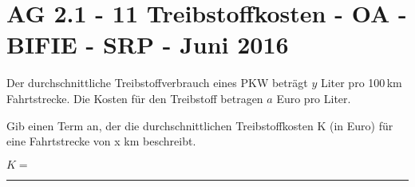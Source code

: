 \section{AG 2.1 - 11 Treibstoffkosten - OA - BIFIE - SRP - Juni 2016}

\begin{beispiel}[AG 2.1]{1} %
Der durchschnittliche Treibstoffverbrauch eines PKW beträgt $y$ Liter pro 100\,km Fahrtstrecke.
Die Kosten für den Treibstoff betragen $a$ Euro pro Liter.\leer

Gib einen Term an, der die durchschnittlichen Treibstoffkosten K (in Euro) für eine Fahrtstrecke
von x km beschreibt. \leer

$K=$\rule{5cm}{0.3pt}

\end{beispiel}
